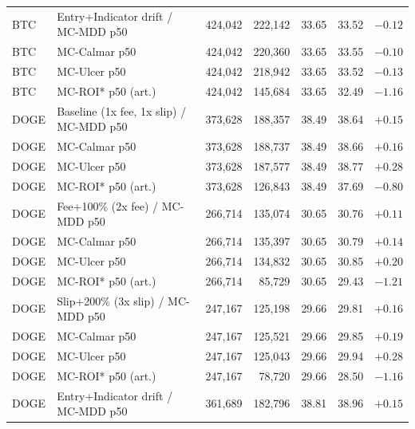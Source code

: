 \begin{table}[ht]
\begin{tabular}{llrrrrr}
BTC & Entry+Indicator drift / MC-MDD p50 & 424,042 & 222,142 & 33.65 & 33.52 & $-0.12$ \\
BTC & \hspace{1em}MC-Calmar p50 & 424,042 & 220,360 & 33.65 & 33.55 & $-0.10$ \\
BTC & \hspace{1em}MC-Ulcer p50 & 424,042 & 218,942 & 33.65 & 33.52 & $-0.13$ \\
BTC & \hspace{1em}MC-ROI* p50 (art.) & 424,042 & 145,684 & 33.65 & 32.49 & $-1.16$ \\
\midrule
DOGE & Baseline (1x fee, 1x slip) / MC-MDD p50 & 373,628 & 188,357 & 38.49 & 38.64 & $+0.15$ \\
DOGE & \hspace{1em}MC-Calmar p50 & 373,628 & 188,737 & 38.49 & 38.66 & $+0.16$ \\
DOGE & \hspace{1em}MC-Ulcer p50 & 373,628 & 187,577 & 38.49 & 38.77 & $+0.28$ \\
DOGE & \hspace{1em}MC-ROI* p50 (art.) & 373,628 & 126,843 & 38.49 & 37.69 & $-0.80$ \\
DOGE & Fee+100\% (2x fee) / MC-MDD p50 & 266,714 & 135,074 & 30.65 & 30.76 & $+0.11$ \\
DOGE & \hspace{1em}MC-Calmar p50 & 266,714 & 135,397 & 30.65 & 30.79 & $+0.14$ \\
DOGE & \hspace{1em}MC-Ulcer p50 & 266,714 & 134,832 & 30.65 & 30.85 & $+0.20$ \\
DOGE & \hspace{1em}MC-ROI* p50 (art.) & 266,714 & 85,729 & 30.65 & 29.43 & $-1.21$ \\
DOGE & Slip+200\% (3x slip) / MC-MDD p50 & 247,167 & 125,198 & 29.66 & 29.81 & $+0.16$ \\
DOGE & \hspace{1em}MC-Calmar p50 & 247,167 & 125,521 & 29.66 & 29.85 & $+0.19$ \\
DOGE & \hspace{1em}MC-Ulcer p50 & 247,167 & 125,043 & 29.66 & 29.94 & $+0.28$ \\
DOGE & \hspace{1em}MC-ROI* p50 (art.) & 247,167 & 78,720 & 29.66 & 28.50 & $-1.16$ \\
DOGE & Entry+Indicator drift / MC-MDD p50 & 361,689 & 182,796 & 38.81 & 38.96 & $+0.15$ \\

\end{tabular}
\end{table}
